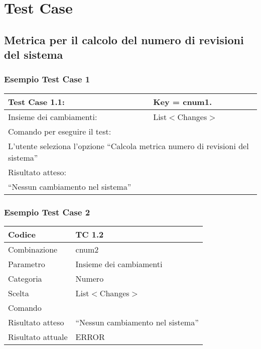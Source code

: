 \chapter{Test Case}

\section{Metrica per il calcolo del numero di revisioni del sistema}
\subsection{Esempio Test Case 1}
\begin{table}[ht]
\begin{tabular}{|l|l|}
\hline
Test Case 1.1:				&	{Key = cnum1.}						\\
\hline
Insieme dei cambiamenti:	&	List$<$Changes$>$					\\
\hline
\multicolumn{2}{|l|}{ Comando per eseguire il test: }					\\
\multicolumn{2}{|p{13cm}|}{ L'utente seleziona l'opzione ``Calcola metrica numero di revisioni del sistema'' }			\\
\hline
\multicolumn{2}{|l|}{ Risultato atteso: }			\\
\multicolumn{2}{|p{13cm}|}{ ``Nessun cambiamento nel sistema'' }			\\
\hline
\end{tabular}
\end{table}
\subsection{Esempio Test Case 2}
\begin{table}[ht]
\begin{tabular}{|p{4cm}|p{9cm}|}
\hline
\rowcolor{lightgray}Codice	&	TC 1.2								\\
\hline
Combinazione				&	cnum2								\\
\hline
Parametro					&	Insieme dei cambiamenti				\\
\hline
Categoria					&	Numero								\\
\hline
Scelta						&	List$<$Changes$>$					\\
\hline
Comando						&										\\
\hline
Risultato atteso 			&	``Nessun cambiamento nel sistema''	\\
\hline
Risultato attuale 			&	ERROR								\\
\hline
\end{tabular}
\end{table}

\clearpage
